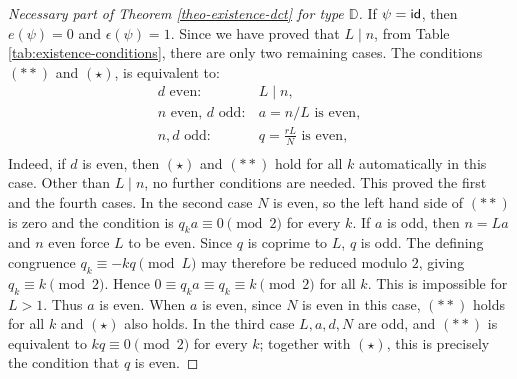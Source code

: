 \documentclass[12pt]{article}
\theoremstyle{plain}
\theoremstyle{definition}
\DeclareMathOperator{\id}{\sf id}
\begin{document}
\begin{proof}[Necessary part of Theorem \ref{theo-existence-dct} for type $\mathbb{D}$]
If \(\psi=\id\), then $e(\psi)=0$ and $\epsilon(\psi)=1$. Since we have proved that $L\mid n$, from Table \ref{tab:existence-conditions}, there are only two remaining cases. The conditions \((**)\) and  \((\star)\), is equivalent to:
\[
\begin{array}{ll}
 d \text{ even}: & L\mid n,\\
n \text{ even},\, d \text{ odd}:&
a=n/L\text{ is even},\\
n,d \text{ odd}:&
\text{\(q=\frac{rL}{N}\) is even},\\
\end{array}
\]
Indeed, if $d$ is even, then  $(\star)$ and $(**)$ hold for all $k$ automatically in this case.   Other than $L\mid n$, no further conditions are needed. This proved the first and the fourth cases. In the second case \(N\) is even, so the left hand
side of \((**)\) is zero and the condition is \(q_ka\equiv0\pmod2\) for every
\(k\).  If \(a\) is odd, then \(n=La\) and \(n\) even force \(L\) to be
even. Since \(q\) is coprime to \(L\), \(q\) is odd. The defining congruence
\(q_k\equiv-kq\pmod L\) may therefore be reduced modulo \(2\), giving
\(q_k\equiv k\pmod2\). Hence \(0\equiv q_ka\equiv q_k\equiv k\pmod2\) for all \(k\). This is impossible for $L>1$. Thus $a$ is even. When $a$ is even, since $N$ is even in this case, $(**)$ holds for all $k$ and $(\star)$ also holds.  In the third case \(L,a,d,N\) are odd, and
\((**)\) is equivalent to \(kq\equiv0\pmod2\) for every \(k\); together with
\((\star)\), this is precisely the condition that \(q\) is even.  


\end{proof}
\end{document}
